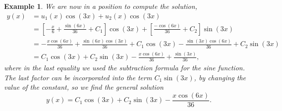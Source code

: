 \documentclass[11pt]{amsart}
\newtheorem{example}{Example}
\numberwithin{equation}{section}
\begin{document}
\begin{example}
We are now in a position to compute the solution, 
\begin{align*}
y(x) & = u_1(x)\cos(3x)+u_2(x)\cos(3x) \\
& = \left[-\frac{x}{6} + \frac{\sin(6x)}{36} + C_1 \right]\cos(3x) + \left[\frac{-\cos(6x)}{36} + C_2\right]\sin(3x) \\
& = -\frac{x\cos(6x)}{36} + \frac{\sin(6x)\cos(3x)}{36} + C_1\cos(3x) - \frac{\sin(3x)\cos(6x)}{36} + C_2\sin(3x) \\
& = C_1\cos(3x) + C_2\sin(3x) -\frac{x\cos(6x)}{36} +\frac{\sin(3x)}{36},
\end{align*}
where in the last equality we used the subtraction formula for the sine function. The last factor can be incorporated into the term $C_1\sin(3x)$, by changing the value of the constant, so we find the general solution
\begin{equation*}
y(x)= C_1\cos(3x) + C_2\sin(3x) -\frac{x\cos(6x)}{36}.
\end{equation*}
\end{example}
\end{document}
